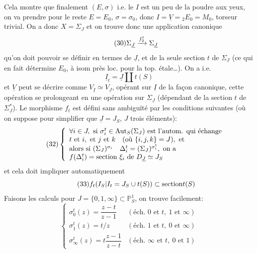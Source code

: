 Cela montre que finalement $(E,\sigma)$ i.e. le $I$ est un peu de la poudre aux yeux, on va prendre pour le reste $E=E_0$, $\sigma=\sigma_0$, donc $I=\underline V={}_2E_0=M_0$, torseur trivial. On a donc  $X=\Sigma_J$ et on trouve donc
une application canonique
\[
\tag{30}\Sigma_{\underline J}\xrightarrow{f_{2}^t}\Sigma_{\underline J}
\]
qu'on doit pouvoir se définir en termes de $\underline J$, et de la seule section $t$ de $\Sigma_{\underline J}$ (ce qui en fait détermine $E_0$, à isom  près loc. pour la top. étale\ldots). On a i.e.
\[
\tag{31}\underline I_t=\underline J\amalg t(S)
\]
et  $\underline V$ peut se décrire comme $V_{\underline I}\simeq V_{\underline J}$, opérant sur $\underline I$ de la façon canonique, cette opération se prolongeant en une opération sur $\Sigma_{\underline J}$ (dépendant de la section $t$ de $\Sigma_{\underline J}^*$). Le  morphisme $f_t$ est défini sans ambiguïté par les conditions suivantes (où on suppose pour simplifier que $\underline J=J_S$, $J$   trois éléments):
\[
\tag{32}\left\{\begin{array}{l}
\forall i\in J,\ \text{si }\sigma_i^t\in\operatorname{Aut}_S(\Sigma_J)\text{ est l'autom. qui échange}\\
t\text{ et }i,\text{ et }j\text{ et }k\quad(\text{où }\{i,j,k\}=J),\text{ et}\\
\text{alors }\text{si }(\Sigma_J)^{\sigma_i}\quad\Delta_i^t=(\Sigma_J)^{\sigma_i^t},\text{ on a}\\
f(\Delta_i^t)=\text{section }\xi_i\text{ de }D_{\underline J}\simeq J_S
\end{array}\right.
\]
et cela doit impliquer automatiquement
\[
\tag{33}f_t(I_S|I_t=J_S\cup t(S))\subset\text{section}t(S)
\]
Faisons les calculs pour $J=\{0,1,\infty\}\subset\mathbb P^1_S$, on trouve facilement:
\[
\tag{34}\left\{\begin{array}{ll}
\sigma_0^t(z)=\dfrac{z-t}{z-1}&(\text{éch. }0\text{ et }t,\ 1\text{ et }\infty)\\
\sigma_1^t(z)=t/z&(\text{éch. }1\text{ et }t,\ 0\text{ et }\infty)\\
\sigma_\infty^t(z)=t\dfrac{z-1}{z-t}&(\text{éch. }\infty\text{ et }t,\ 0\text{ et }1)
\end{array}\right.
\]
